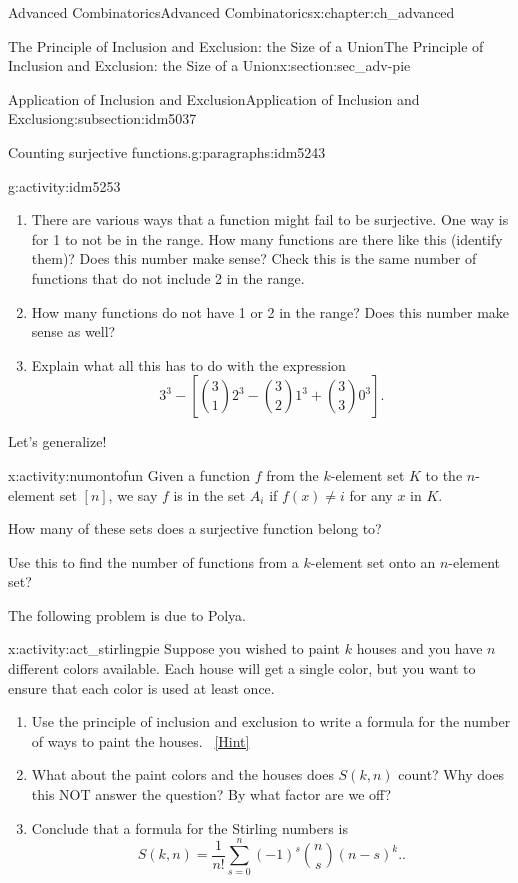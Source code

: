 \documentclass[oneside,10pt,]{book}
\numberwithin{equation}{chapter}
\begin{document}
\begin{chapterptx}{Advanced Combinatorics}{}{Advanced Combinatorics}{}{}{x:chapter:ch_advanced}
\begin{sectionptx}{The Principle of Inclusion and Exclusion: the Size of a Union}{}{The Principle of Inclusion and Exclusion: the Size of a Union}{}{}{x:section:sec_adv-pie}
\begin{subsectionptx}{Application of Inclusion and Exclusion}{}{Application of Inclusion and Exclusion}{}{}{g:subsection:idm5037}
\begin{paragraphs}{Counting surjective functions.}{g:paragraphs:idm5243}
\begin{activity}{}{g:activity:idm5253}
\begin{enumerate}[font=\bfseries,label=(\alph*),ref=\alph*]
\item{}There are various ways that a function might fail to be surjective.  One way is for 1 to not be in the range.  How many functions are there like this (identify them)?  Does this number make sense?  Check this is the same number of functions that do not include 2 in the range.%
\item{}How many functions do not have 1 or 2 in the range?  Does this number make sense as well?%
\item{}Explain what all this has to do with the expression%
\begin{equation*}
3^3 - \left[ \binom{3}{1}2^3 - \binom{3}{2}1^3 + \binom{3}{3}0^3\right]\text{.}
\end{equation*}
%
\end{enumerate}
\end{activity}
Let's generalize!%
\begin{activity}{}{x:activity:numontofun}%
Given a function \(f\) from the \(k\)-element set \(K\) to the \(n\)-element set \([n]\), we say \(f\) is in the set \(A_i\) if \(f(x)\not= i\) for any \(x\) in \(K\).%
\par
How many of these sets does a surjective function belong to?%
\par
Use this to find the number of functions from a \(k\)-element set onto an \(n\)-element set?%
\end{activity}
The following problem is due to Polya.%
\begin{activity}{}{x:activity:act_stirlingpie}%
Suppose you wished to paint \(k\) houses and you have \(n\) different colors available.  Each house will get a single color, but you want to ensure that each color is used at least once.%
\begin{enumerate}[font=\bfseries,label=(\alph*),ref=\alph*]
\item{}Use the principle of inclusion and exclusion to write a formula for the number of ways to paint the houses.%
\qquad~\hfill{\tiny\hyperlink{g:hint:idm5321-back}{[Hint]}}\item{}What about the paint colors and the houses does \(S(k,n)\) count?  Why does this NOT answer the question?  By what factor are we off?%
\item{}Conclude that a formula for the Stirling numbers is%
\begin{equation*}
S(k,n) = \frac{1}{n!}\sum_{s=0}^n (-1)^s\binom{n}{s}(n-s)^k.\text{.}
\end{equation*}

\end{enumerate}
\end{activity}
\end{paragraphs}
\end{subsectionptx}
\end{sectionptx}
\end{chapterptx}
\end{document}
